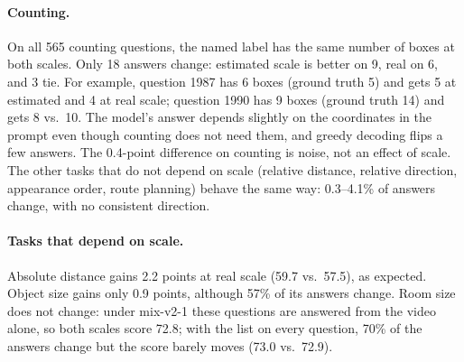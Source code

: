 \paragraph{Counting.}
On all 565 counting questions, the named label has the same number of boxes at both scales. Only 18 answers change:
estimated scale is better on 9, real on 6, and 3 tie. For example, question 1987 has 6 boxes (ground truth 5) and gets 5 at
estimated and 4 at real scale; question 1990 has 9 boxes (ground truth 14) and gets 8 vs.\ 10. The model's answer depends
slightly on the coordinates in the prompt even though counting does not need them, and greedy decoding flips a few answers.
The 0.4-point difference on counting is noise, not an effect of scale. The other tasks that do not depend on scale (relative
distance, relative direction, appearance order, route planning) behave the same way: 0.3--4.1\% of answers change, with no
consistent direction.

\paragraph{Tasks that depend on scale.}
Absolute distance gains 2.2 points at real scale (59.7 vs.\ 57.5), as expected. Object size gains only 0.9 points,
although 57\% of its answers change. Room size does not change: under mix-v2-1 these questions are answered from the video
alone, so both scales score 72.8; with the list on every question, 70\% of the answers change but the score barely moves
(73.0 vs.\ 72.9).

